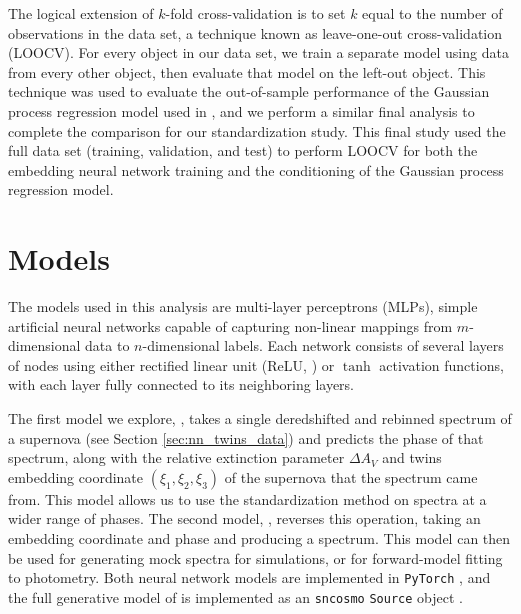 The logical extension of $k$-fold cross-validation is to set $k$ equal to the number of observations in the data set, a technique known as leave-one-out cross-validation (LOOCV). For every object in our data set, we train a separate model using data from every other object, then evaluate that model on the left-out object. This technique was used to evaluate the out-of-sample performance of the Gaussian process regression model used in , and we perform a similar final analysis to complete the comparison for our standardization study. This final study used the full data set (training, validation, and test) to perform LOOCV for both the \stoe{} embedding neural network training and the conditioning of the Gaussian process regression model.

\section{Models} \label{sec:model}
The models used in this analysis are multi-layer perceptrons (MLPs), simple artificial neural networks capable of capturing non-linear mappings from $m$-dimensional data to $n$-dimensional labels. Each network consists of several layers of nodes using either rectified linear unit (ReLU, \citet{nair_rectified_2010}) or $\tanh$ activation functions, with each layer fully connected to its neighboring layers.

The first model we explore, \stoe, takes a single deredshifted and rebinned spectrum of a supernova (see Section \ref{sec:nn_twins_data}) and predicts the phase of that spectrum, along with the relative extinction parameter $\Delta A_V$ and twins embedding coordinate $(\xi_1, \xi_2, \xi_3)$ of the supernova that the spectrum came from. This model allows us to use the  standardization method on spectra at a wider range of phases. The second model, \etos, reverses this operation, taking an embedding coordinate and phase and producing a spectrum. This model can then be used for generating mock spectra for simulations, or for forward-model fitting to photometry. Both neural network models are implemented in \texttt{PyTorch} \citep{paszke_pytorch_2019}, and the full generative model of \etos{} is implemented as an \texttt{sncosmo} \texttt{Source} object \citep{barbary_sncosmo_2015}.


